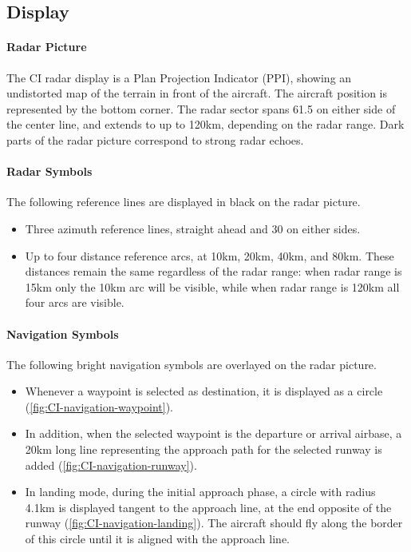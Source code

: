 \subsection{Display}

\paragraph{Radar Picture}
The CI radar display is a Plan Projection Indicator (PPI),
showing an undistorted map of the terrain in front of the aircraft.
The aircraft position is represented by the bottom corner.
The radar sector spans 61.5\textdegree{} on either side of the center line,
and extends to up to 120km, depending on the radar range.
Dark parts of the radar picture correspond to strong radar echoes.

\paragraph{Radar Symbols}
The following reference lines are displayed in black on the radar picture.
\begin{itemize}
  \item Three azimuth reference lines, straight ahead and 30\textdegree{} on either sides.
  \item Up to four distance reference arcs, at 10km, 20km, 40km, and 80km.
    These distances remain the same regardless of the radar range:
    when radar range is 15km only the 10km arc will be visible,
    while when radar range is 120km all four arcs are visible.
\end{itemize}

\paragraph{Navigation Symbols}
The following bright navigation symbols are overlayed on the radar picture.
\begin{itemize}
  \item Whenever a waypoint is selected as destination,
    it is displayed as a circle (\cref{fig:CI-navigation-waypoint}).
  \item In addition, when the selected waypoint is the departure or arrival airbase,
    a 20km long line representing the approach path for the selected runway is added
    (\cref{fig:CI-navigation-runway}).
  \item In landing mode, during the initial approach phase, a circle with radius 4.1km
    is displayed tangent to the approach line, at the end opposite of the runway (\cref{fig:CI-navigation-landing}).
    The aircraft should fly along the border of this circle until it is aligned with the approach line.
\end{itemize}

